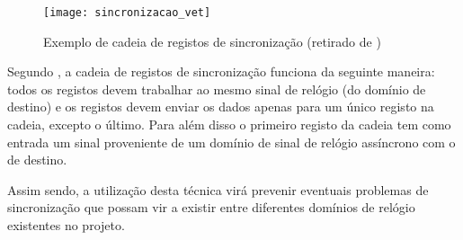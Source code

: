 \begin{figure}[h!]
	\begin{center}
		\leavevmode
		\texttt{[image: sincronizacao\_vet]}
		\caption[Exemplo de cadeia de registos de sincronização]{Exemplo de cadeia de registos de sincronização (retirado de \cite{R037})}
		\label{fig:sincronizacao}
	\end{center}
\end{figure}

Segundo \cite{R037}, a cadeia de registos de sincronização funciona da seguinte maneira: todos os registos devem trabalhar ao mesmo sinal de relógio (do domínio de destino) e os registos devem enviar os dados apenas para um único registo na cadeia, excepto o último. Para além disso o primeiro registo da cadeia tem como entrada um sinal proveniente de um domínio de sinal de relógio assíncrono com o de destino.

Assim sendo, a utilização desta técnica virá prevenir eventuais problemas de sincronização que possam vir a existir entre diferentes domínios de relógio existentes no projeto.